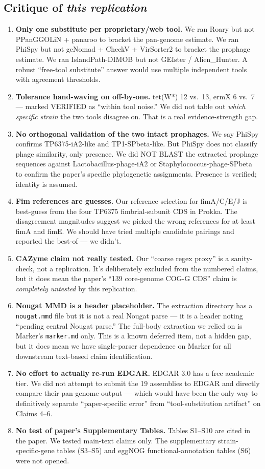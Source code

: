 \documentclass[11pt,a4paper]{article}
\begin{document}
\subsection{Critique of \emph{this replication}}
\begin{enumerate}
\item \textbf{Only one substitute per proprietary/web tool.} We ran Roary but not PPanGGOLiN + panaroo to bracket the pan-genome estimate. We ran PhiSpy but not geNomad + CheckV + VirSorter2 to bracket the prophage estimate. We ran IslandPath-DIMOB but not GEIster / Alien\_Hunter. A robust ``free-tool substitute'' answer would use multiple independent tools with agreement thresholds.
\item \textbf{Tolerance hand-waving on off-by-one.} tet(W*) 12 vs.\ 13, ermX 6 vs.\ 7 --- marked VERIFIED as ``within tool noise.'' We did not table out \emph{which specific strain} the two tools disagree on. That is a real evidence-strength gap.
\item \textbf{No orthogonal validation of the two intact prophages.} We say PhiSpy confirms TP6375-iA2-like and TP1-SPbeta-like. But PhiSpy does not classify phage similarity, only presence. We did NOT BLAST the extracted prophage sequences against Lactobacillus-phage-iA2 or Staphylococcus-phage-SPbeta to confirm the paper's specific phylogenetic assignments. Presence is verified; identity is assumed.
\item \textbf{Fim references are guesses.} Our reference selection for fimA/C/E/J is best-guess from the four TP6375 fimbrial-subunit CDS in Prokka. The disagreement magnitudes suggest we picked the wrong references for at least fimA and fimE. We should have tried multiple candidate pairings and reported the best-of --- we didn't.
\item \textbf{CAZyme claim not really tested.} Our ``coarse regex proxy'' is a sanity-check, not a replication. It's deliberately excluded from the numbered claims, but it does mean the paper's ``139 core-genome COG-G CDS'' claim is \emph{completely untested} by this replication.
\item \textbf{Nougat MMD is a header placeholder.} The extraction directory has a \texttt{nougat.mmd} file but it is not a real Nougat parse --- it is a header noting ``pending central Nougat parse.'' The full-body extraction we relied on is Marker's \texttt{marker.md} only. This is a known deferred item, not a hidden gap, but it does mean we have single-parser dependence on Marker for all downstream text-based claim identification.
\item \textbf{No effort to actually re-run EDGAR.} EDGAR 3.0 has a free academic tier. We did not attempt to submit the 19 assemblies to EDGAR and directly compare their pan-genome output --- which would have been the only way to definitively separate ``paper-specific error'' from ``tool-substitution artifact'' on Claims 4--6.
\item \textbf{No test of paper's Supplementary Tables.} Tables S1--S10 are cited in the paper. We tested main-text claims only. The supplementary strain-specific-gene tables (S3--S5) and eggNOG functional-annotation tables (S6) were not opened.
\end{enumerate}
\end{document}
